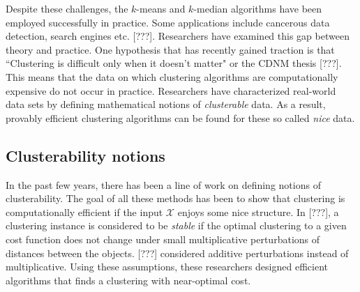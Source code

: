 \documentclass[11pt]{article}
\newcommand{\mc}{\mathcal}
\begin{document}
Despite these challenges, the $k$-means and $k$-median algorithms have been employed successfully in practice. Some applications include cancerous data detection, search engines etc. {\color{red} [???]}. Researchers have examined this gap between theory and practice. One hypothesis that has recently gained traction is that ``Clustering is difficult only when it doesn't matter" or the CDNM thesis {\color{red} [???]}. This means that the data on which clustering algorithms are computationally expensive do not occur in practice. Researchers have characterized real-world data sets by defining mathematical notions of \textit{clusterable} data. As a result, provably efficient clustering algorithms can be found for these so called {\em nice} data.  

\subsection{Clusterability notions}
\label{subsection:clusterabilitynotion}
In the past few years, there has been a line of work on defining notions of clusterability. The goal of all these methods has been to show that clustering is computationally efficient if the input $\mc X$ enjoys some nice structure. In {\color{red} [???]\cite{bilu2012stable}}, a clustering instance is considered to be \emph{stable} if the optimal clustering to a given cost function does not change under small multiplicative perturbations of distances between the objects. {\color{red} [???]\cite{ackerman2009clusterability}} considered additive perturbations instead of multiplicative.  Using these assumptions, these researchers designed efficient algorithms that finds a clustering with near-optimal cost. 
\end{document}
